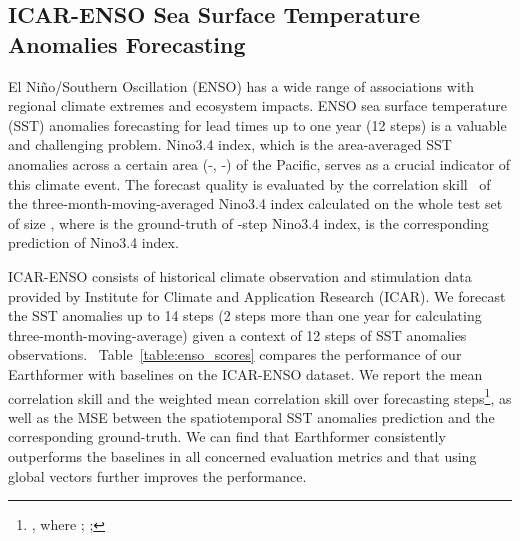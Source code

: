 \documentclass{article}
\newcommand{\tabref}[1]{Table~\ref{#1}}
\begin{document}
\subsection{ICAR-ENSO Sea Surface Temperature Anomalies Forecasting}
El Niño/Southern Oscillation (ENSO) has a wide range of associations with regional climate extremes and ecosystem impacts.
ENSO sea surface temperature (SST) anomalies forecasting for lead times up to one year (12 steps) is a valuable and challenging problem. Nino3.4 index, which is the area-averaged SST anomalies across a certain area (-, -) of the Pacific, serves as a crucial indicator of this climate event. 
The forecast quality is evaluated by the correlation skill~\cite{ham2019deep} of the three-month-moving-averaged Nino3.4 index  calculated on the whole test set of size , where  is the ground-truth of -step Nino3.4 index,  is the corresponding prediction of Nino3.4 index.

ICAR-ENSO consists of historical climate observation and stimulation data provided by Institute for Climate and Application Research (ICAR). We forecast the SST anomalies up to 14 steps (2 steps more than one year for calculating three-month-moving-average) given a context of 12 steps of SST anomalies observations. 
~\tabref{table:enso_scores} compares the performance of our Earthformer with baselines on the ICAR-ENSO dataset. 
We report the mean correlation skill  and the weighted mean correlation skill  over  forecasting steps\footnote{, where ; ; }, as well as the MSE between the spatiotemporal SST anomalies prediction and the corresponding ground-truth. 
We can find that Earthformer consistently outperforms the baselines in all concerned evaluation metrics and that using global vectors further improves the performance.
\end{document}
